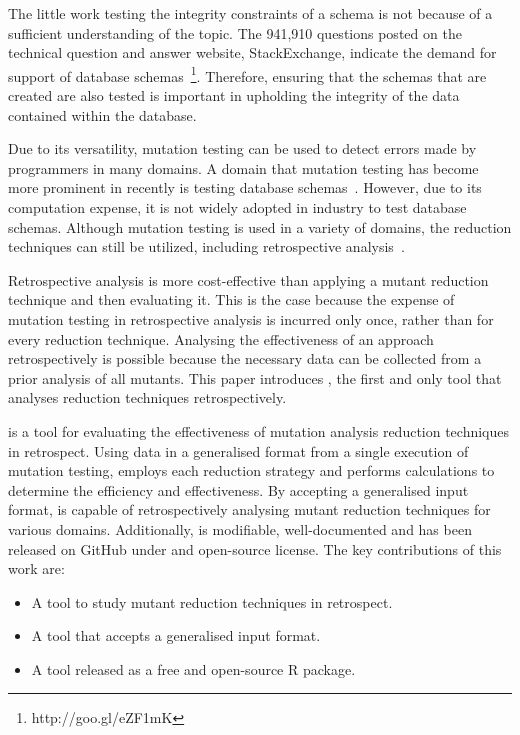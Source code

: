 


The little work testing the integrity constraints of a schema is not
because of a sufficient understanding of the topic. The 941,910 questions posted on
the technical question and answer website, StackExchange, indicate the demand for support
of database schemas~\footnote{http://goo.gl/eZF1mK}. Therefore, ensuring that
the schemas that are created are also tested is important in upholding the integrity
of the data contained within the database.

Due to its versatility, mutation testing can be used to detect errors made by programmers in many domains.
A domain that mutation testing has become more prominent in recently is testing database
schemas~\cite{mcminn2016virtual, mcminn2015effectiveness, wright2013efficient}. However,
due to its computation expense, it is not widely adopted in industry to test database schemas.
Although mutation testing is used in a variety of domains, the reduction techniques can still
be utilized, including retrospective analysis~\cite{jia2011analysis, wong1995reducing, offutt1993experimental, offutt2001mutation}.

Retrospective analysis is more cost-effective than applying a
mutant reduction technique and then evaluating it.
This is the case because the expense of mutation testing in
retrospective analysis is incurred only once, rather than for
every reduction technique. Analysing the effectiveness of an approach retrospectively
is possible because the necessary data can be collected from a prior analysis of all mutants.
This paper introduces \mr, the first and only tool that analyses reduction techniques retrospectively.

\mr is a tool for evaluating the effectiveness of mutation analysis reduction techniques
in retrospect. Using data in a generalised format from a single execution of mutation testing, \mr
employs each reduction strategy and performs calculations to determine the efficiency and
effectiveness. By accepting a generalised input format, \mr is capable of
retrospectively analysing mutant reduction techniques for various domains.
Additionally, \mr is modifiable, well-documented and has been released on
GitHub under and open-source license. The key contributions of this work are:

    \begin{itemize}
        \item A tool to study mutant reduction techniques in retrospect.
        \item A tool that accepts a generalised input format.
        \item A tool released as a free and open-source R package.
    \end{itemize}
